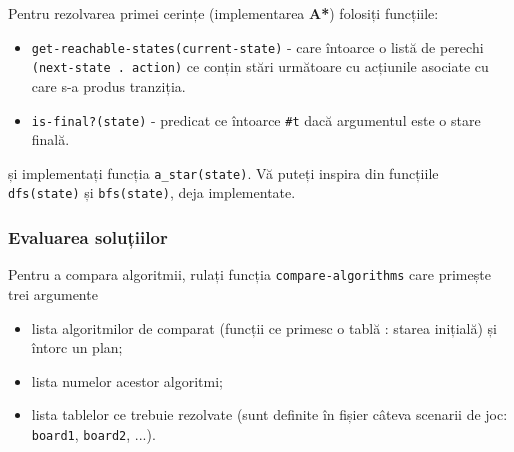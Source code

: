 \documentclass[12pt]{article}
\begin{document}
Pentru rezolvarea primei cerințe (implementarea \textbf{A*}) folosiți
funcțiile:
\begin{itemize}
\item \texttt{get-reachable-states(current-state)} - care întoarce
  o listă de perechi \texttt{(next-state . action)} ce conțin stări
  următoare cu acțiunile asociate cu care s-a produs tranziția.
\item \texttt{is-final?(state)} - predicat ce întoarce \texttt{\#t}
  dacă argumentul este o stare finală.
\end{itemize}

și implementați funcția \texttt{a\_star(state)}. Vă puteți inspira din
funcțiile \texttt{dfs(state)} și \texttt{bfs(state)}, deja
implementate.

\subsubsection*{Evaluarea soluțiilor}
\label{sec:eval}

Pentru a compara algoritmii, rulați funcția
\texttt{compare-algorithms} care primește trei argumente
\begin{itemize}
\item lista algoritmilor de comparat (funcții ce primesc o tablă :
  starea inițială) și întorc un plan;
\item lista numelor acestor algoritmi;
\item lista tablelor ce trebuie rezolvate (sunt definite în fișier
  câteva scenarii de joc: \texttt{board1}, \texttt{board2}, ...).
\end{itemize}
\end{document}
